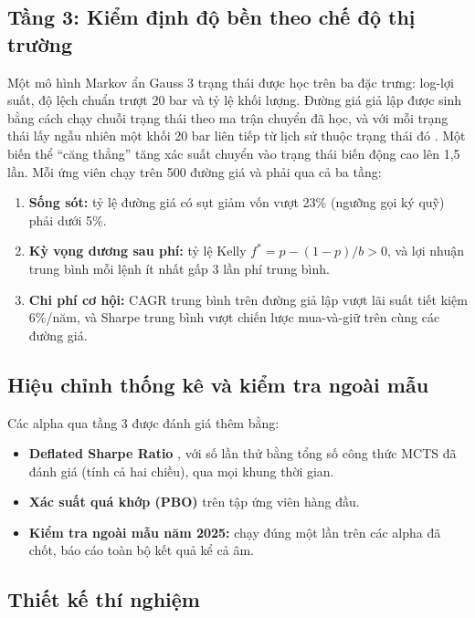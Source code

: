 \documentclass[12pt,a4paper]{article}
\begin{document}
\subsection{Tầng 3: Kiểm định độ bền theo chế độ thị trường}

Một mô hình Markov ẩn Gauss 3 trạng thái được học trên ba đặc trưng: log-lợi suất, độ lệch chuẩn trượt 20 bar và tỷ lệ khối lượng. Đường giá giả lập được sinh bằng cách chạy chuỗi trạng thái theo ma trận chuyển đã học, và với mỗi trạng thái lấy ngẫu nhiên một khối 20 bar liên tiếp từ lịch sử thuộc trạng thái đó \citep{kunsch1989block}. Một biến thể ``căng thẳng'' tăng xác suất chuyển vào trạng thái biến động cao lên 1,5 lần. Mỗi ứng viên chạy trên 500 đường giá và phải qua cả ba tầng:
\begin{enumerate}
  \item \textbf{Sống sót:} tỷ lệ đường giá có sụt giảm vốn vượt 23\% (ngưỡng gọi ký quỹ) phải dưới 5\%.
  \item \textbf{Kỳ vọng dương sau phí:} tỷ lệ Kelly \citep{kelly1956} $f^* = p - (1-p)/b > 0$, và lợi nhuận trung bình mỗi lệnh ít nhất gấp 3 lần phí trung bình.
  \item \textbf{Chi phí cơ hội:} CAGR trung bình trên đường giả lập vượt lãi suất tiết kiệm 6\%/năm, và Sharpe trung bình vượt chiến lược mua-và-giữ trên cùng các đường giá.
\end{enumerate}

\subsection{Hiệu chỉnh thống kê và kiểm tra ngoài mẫu}
\label{sec:stats}

Các alpha qua tầng 3 được đánh giá thêm bằng:
\begin{itemize}
  \item \textbf{Deflated Sharpe Ratio} \citep{bailey2014dsr}, với số lần thử bằng tổng số công thức MCTS đã đánh giá (tính cả hai chiều), qua mọi khung thời gian.
  \item \textbf{Xác suất quá khớp (PBO)} \citep{bailey2017pbo} trên tập ứng viên hàng đầu.
  \item \textbf{Kiểm tra ngoài mẫu năm 2025:} chạy đúng một lần trên các alpha đã chốt, báo cáo toàn bộ kết quả kể cả âm.
\end{itemize}

\subsection{Thiết kế thí nghiệm}
\end{document}
